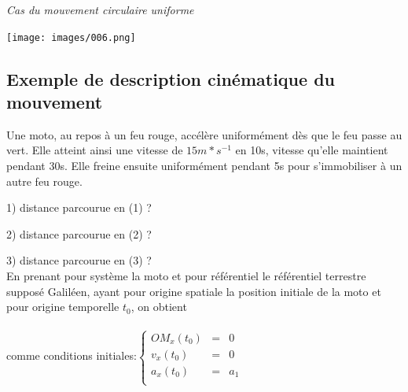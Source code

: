 \documentclass[a4paper,10pt]{book}
\begin{document}
\emph{Cas du mouvement circulaire uniforme}\\
\begin{center}
\texttt{[image: images/006.png]}
\end{center}


\subsection{Exemple de description cinématique du mouvement}
Une moto, au repos à un feu rouge, accélère uniformément dès que le feu passe au vert. Elle atteint ainsi une vitesse de $15 m*s^{-1}$ en 10s, vitesse qu’elle maintient pendant 30s. Elle freine ensuite uniformément pendant 5s pour s’immobiliser à un autre feu rouge.

\begin{center} \end{center}

1) distance parcourue en (1) ?

2) distance parcourue en (2) ?

3) distance parcourue en (3) ?\\

En prenant pour système la moto et pour référentiel le référentiel terrestre supposé Galiléen, ayant pour origine spatiale la position initiale de la moto et pour origine temporelle $t_{0}$, on obtient\\\\
comme conditions initiales:$\left \{ \begin{array}{rcl} OM_{x}(t_{0})&=&0 \\
v_{x}(t_{0})&=&0 \\
a_{x}(t_{0})&=&a_{1} \\ \end{array} \right . $\\\\
\end{document}
